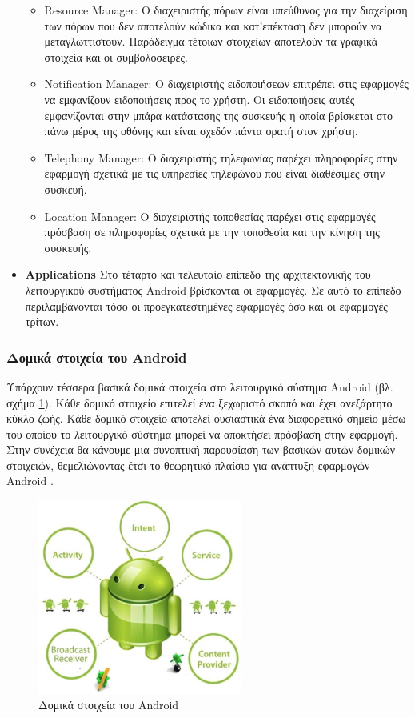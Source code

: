 \begin{itemize}
\begin{itemize}
		 		\item Resource Manager: Ο διαχειριστής πόρων είναι υπεύθυνος για την διαχείριση των πόρων που δεν αποτελούν κώδικα και κατ'επέκταση δεν μπορούν να μεταγλωττιστούν. Παράδειγμα τέτοιων στοιχείων αποτελούν τα γραφικά στοιχεία και οι συμβολοσειρές.
		 		\item Notification Manager: Ο διαχειριστής ειδοποιήσεων επιτρέπει στις εφαρμογές να εμφανίζουν ειδοποιήσεις προς το χρήστη. Οι ειδοποιήσεις αυτές εμφανίζονται στην μπάρα κατάστασης της συσκευής η οποία βρίσκεται στο πάνω μέρος της οθόνης και είναι σχεδόν πάντα ορατή στον χρήστη.
		 		\item Telephony Manager: Ο διαχειριστής τηλεφωνίας παρέχει πληροφορίες στην εφαρμογή σχετικά με τις υπηρεσίες τηλεφώνου που είναι διαθέσιμες στην συσκευή.
		 		\item Location Manager: Ο διαχειριστής τοποθεσίας παρέχει στις εφαρμογές πρόσβαση σε πληροφορίες σχετικά με την τοποθεσία και την κίνηση της συσκευής.
		 	\end{itemize}
		 	\item \textbf{Applications} Στο τέταρτο και τελευταίο επίπεδο της αρχιτεκτονικής του λειτουργικού συστήματος Android βρίσκονται οι εφαρμογές. Σε αυτό το επίπεδο περιλαμβάνονται τόσο οι προεγκατεστημένες εφαρμογές όσο και οι εφαρμογές τρίτων.
		 \end{itemize}
		 
		\subsubsection{Δομικά στοιχεία του Android}
		Υπάρχουν τέσσερα βασικά δομικά στοιχεία στο λειτουργικό σύστημα Android (βλ. σχήμα \ref{fig:android_fundamental_components}). Κάθε δομικό στοιχείο επιτελεί ένα ξεχωριστό σκοπό και έχει ανεξάρτητο κύκλο ζωής. Κάθε δομικό στοιχείο αποτελεί ουσιαστικά ένα διαφορετικό σημείο μέσω του οποίου το λειτουργικό σύστημα μπορεί να αποκτήσει πρόσβαση στην εφαρμογή. Στην συνέχεια θα κάνουμε μια συνοπτική παρουσίαση των βασικών αυτών δομικών στοιχειών, θεμελιώνοντας έτσι το θεωρητικό πλαίσιο για ανάπτυξη εφαρμογών Android \cite{androidComponentsKnoxville}\cite{androidFundamentalsOfficial}.
		
		\begin{figure}[h]
			\centering
			\includegraphics[width=0.6\textwidth]{android_fundamental_components.jpg}
			\caption{Δομικά στοιχεία του Android}
			\label{fig:android_fundamental_components}
		\end{figure}
		
